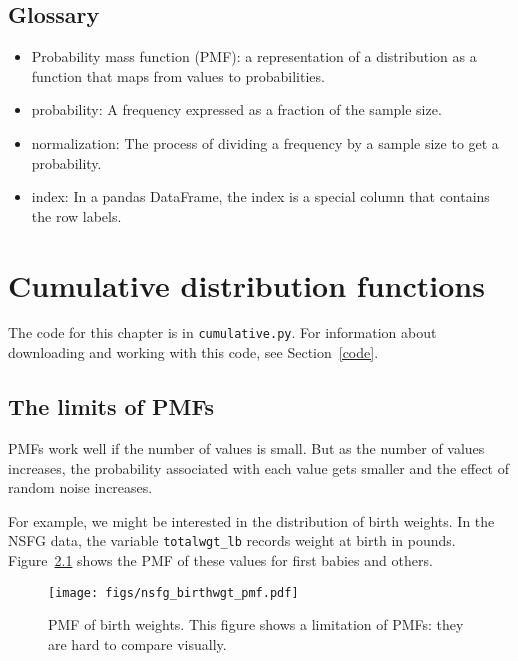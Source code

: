 \documentclass[12pt]{book}
\begin{document}
\section{Glossary}

\begin{itemize}

\item Probability mass function (PMF): a representation of a distribution
as a function that maps from values to probabilities.

\item probability: A frequency expressed as a fraction of the sample
size.

\item normalization: The process of dividing a frequency by a sample
size to get a probability.

\item index: In a pandas DataFrame, the index is a special column
that contains the row labels.

\end{itemize}


\chapter{Cumulative distribution functions}
\label{cumulative}

The code for this chapter is in {\tt cumulative.py}.
For information about downloading and
working with this code, see Section~\ref{code}.


\section{The limits of PMFs}

PMFs work well if the number of values is small.  But as the number of
values increases, the probability associated with each value gets
smaller and the effect of random noise increases.

For example, we might be interested in the distribution of birth
weights.  In the NSFG data, the variable \verb"totalwgt_lb" records
weight at birth in pounds.  Figure~\ref{nsfg_birthwgt_pmf} shows
the PMF of these values for first babies and others.
  

\begin{figure}
\centerline{\texttt{[image: figs/nsfg\_birthwgt\_pmf.pdf]}}
\caption{PMF of birth weights.  This figure shows a limitation
of PMFs: they are hard to compare visually.}
\label{nsfg_birthwgt_pmf}
\end{figure}
\end{document}
